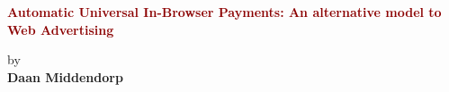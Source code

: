 \begin{titlepage}
	\strut
	\hfill
	\begin{center}
	\vspace{1cm}
		\Huge
		\begin{spacing}{.9}
			\textcolor{DarkRed}{\textbf{Automatic Universal In-Browser Payments: An alternative model to Web Advertising}}\\
		\end{spacing}
		\vspace{0.8cm}
		\large
		by\\
		\vspace{0.8cm}
		\textbf{Daan Middendorp}\\
		\vspace{0.8cm}

\end{center}
\end{titlepage}
